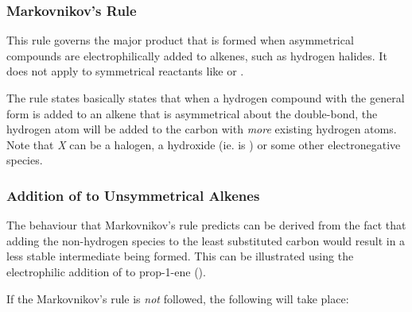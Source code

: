 		\subsubsection{Markovnikov's Rule}

			This rule governs the major product that is formed when asymmetrical compounds are electrophilically added to alkenes,
			such as hydrogen halides. It does not apply to symmetrical reactants like  or .

			The rule states basically states that when a hydrogen compound with the general form  is added to an
			alkene that is asymmetrical about the double-bond, the hydrogen atom will be added to the carbon with \textit{more}
			existing hydrogen atoms. Note that \textit{X} can be a halogen, a hydroxide (ie.  is ) or some other
			electronegative species.











		\pagebreak
		\subsubsection{Addition of  to Unsymmetrical Alkenes}

			The behaviour that Markovnikov's rule predicts can be derived from the fact that adding the non-hydrogen species to the least substituted carbon would
			result in a less stable intermediate being formed. This can be illustrated using the electrophilic addition of
			 to prop-1-ene ().

			If the Markovnikov's rule is \textit{not} followed, the following will take place:



